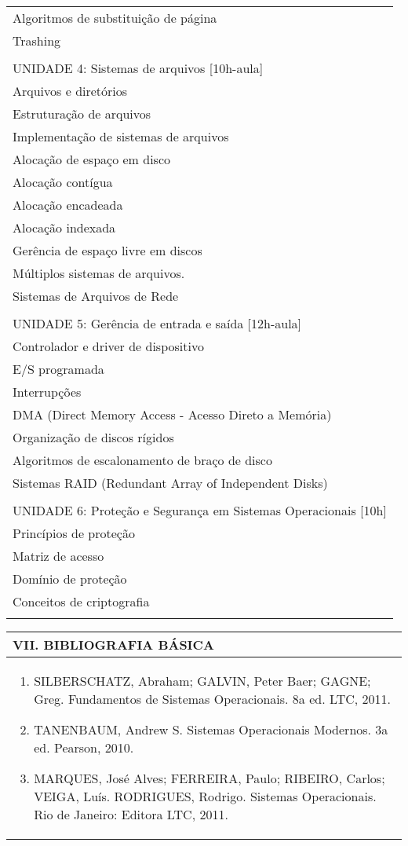 \documentclass[12pt]{article}
\begin{document}
\begin{longtable}{|L{1.025\textwidth}|}
Algoritmos de substituição de página\\
Trashing\\
\\
UNIDADE 4: Sistemas de arquivos [10h-aula]\\
Arquivos e diretórios\\
Estruturação de arquivos\\
Implementação de sistemas de arquivos\\
Alocação de espaço em disco\\
Alocação contígua\\
Alocação encadeada\\
Alocação indexada\\
Gerência de espaço livre em discos\\
Múltiplos sistemas de arquivos.\\
Sistemas de Arquivos de Rede\\
\\
UNIDADE 5: Gerência de entrada e saída [12h-aula]\\
Controlador e driver de dispositivo\\
E/S programada\\
Interrupções\\
DMA (Direct Memory Access - Acesso Direto a Memória)\\
Organização de discos rígidos\\
Algoritmos de escalonamento de braço de disco		\\
Sistemas RAID (Redundant Array of Independent Disks)\\
\\
UNIDADE 6: Proteção e Segurança em Sistemas Operacionais [10h]\\
Princípios de proteção\\
Matriz de acesso\\
Domínio de proteção\\
Conceitos de criptografia\\
\\ \hline
\end{longtable} 

\newpage

\begin{longtable}{|L{1.025\textwidth}|} \hline
%
{\bf VII. BIBLIOGRAFIA BÁSICA} \\ \hline

\begin{enumerate}
\item  SILBERSCHATZ, Abraham; GALVIN, Peter Baer; GAGNE; Greg. Fundamentos de Sistemas Operacionais. 8a ed. LTC, 2011. 
\item TANENBAUM, Andrew S. Sistemas Operacionais Modernos. 3a ed. Pearson, 2010. 
\item MARQUES, José Alves; FERREIRA, Paulo; RIBEIRO, Carlos; VEIGA, Luís. RODRIGUES, Rodrigo. Sistemas Operacionais. Rio de Janeiro: Editora LTC, 2011.

\end{enumerate}
 \\ \hline
\end{longtable}
\end{document}
